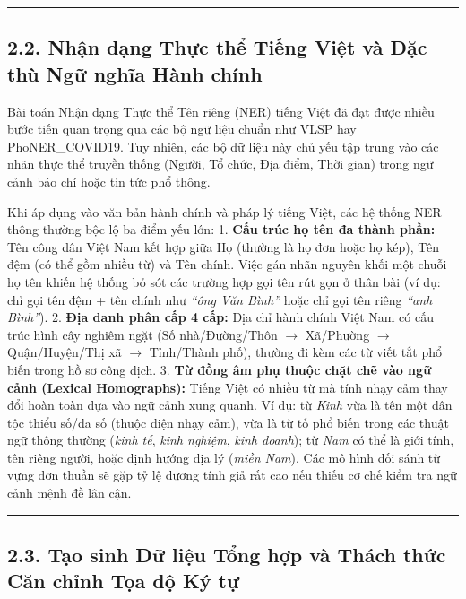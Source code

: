 \documentclass[
  11pt,
  a4paper,
]{article}
\begin{document}
\begin{center}\rule{0.5\linewidth}{0.5pt}\end{center}

\subsection{2.2. Nhận dạng Thực thể Tiếng Việt và Đặc thù Ngữ nghĩa Hành
chính}\label{nhux1eadn-dux1ea1ng-thux1ef1c-thux1ec3-tiux1ebfng-viux1ec7t-vuxe0-ux111ux1eb7c-thuxf9-ngux1eef-nghux129a-huxe0nh-chuxednh}

Bài toán Nhận dạng Thực thể Tên riêng (NER) tiếng Việt đã đạt được nhiều bước tiến quan trọng qua
các bộ ngữ liệu chuẩn như VLSP hay PhoNER\_COVID19. Tuy nhiên, các bộ dữ liệu này chủ yếu tập trung
vào các nhãn thực thể truyền thống (Người, Tổ chức, Địa điểm, Thời gian) trong ngữ cảnh báo chí hoặc
tin tức phổ thông.

Khi áp dụng vào văn bản hành chính và pháp lý tiếng Việt, các hệ thống NER thông thường bộc lộ ba
điểm yếu lớn: 1. \textbf{Cấu trúc họ tên đa thành phần:} Tên công dân Việt Nam kết hợp giữa Họ
(thường là họ đơn hoặc họ kép), Tên đệm (có thể gồm nhiều từ) và Tên chính. Việc gán nhãn nguyên
khối một chuỗi họ tên khiến hệ thống bỏ sót các trường hợp gọi tên rút gọn ở thân bài (ví dụ: chỉ
gọi tên đệm + tên chính như \emph{``ông Văn Bình''} hoặc chỉ gọi tên riêng \emph{``anh Bình''}). 2.
\textbf{Địa danh phân cấp 4 cấp:} Địa chỉ hành chính Việt Nam có cấu trúc hình cây nghiêm ngặt (Số
nhà/Đường/Thôn \(\to\) Xã/Phường \(\to\) Quận/Huyện/Thị xã \(\to\) Tỉnh/Thành phố), thường đi kèm
các từ viết tắt phổ biến trong hồ sơ công dịch. 3. \textbf{Từ đồng âm phụ thuộc chặt chẽ vào ngữ
cảnh (Lexical Homographs):} Tiếng Việt có nhiều từ mà tính nhạy cảm thay đổi hoàn toàn dựa vào ngữ
cảnh xung quanh. Ví dụ: từ \emph{Kinh} vừa là tên một dân tộc thiểu số/đa số (thuộc diện nhạy cảm),
vừa là từ tố phổ biến trong các thuật ngữ thông thường (\emph{kinh tế}, \emph{kinh nghiệm},
\emph{kinh doanh}); từ \emph{Nam} có thể là giới tính, tên riêng người, hoặc định hướng địa lý
(\emph{miền Nam}). Các mô hình đối sánh từ vựng đơn thuần sẽ gặp tỷ lệ dương tính giả rất cao nếu
thiếu cơ chế kiểm tra ngữ cảnh mệnh đề lân cận.

\begin{center}\rule{0.5\linewidth}{0.5pt}\end{center}

\subsection{2.3. Tạo sinh Dữ liệu Tổng hợp và Thách thức Căn chỉnh Tọa độ Ký
tự}\label{tux1ea1o-sinh-dux1eef-liux1ec7u-tux1ed5ng-hux1ee3p-vuxe0-thuxe1ch-thux1ee9c-cux103n-chux1ec9nh-tux1ecda-ux111ux1ed9-kuxfd-tux1ef1}
\end{document}
